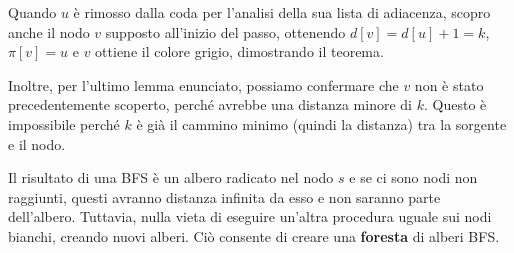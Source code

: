 \noindent Quando $u$ è rimosso dalla coda per l'analisi della sua lista di adiacenza, scopro anche il nodo $v$ supposto all'inizio del passo, ottenendo $d[v] = d[u]+1 = k$, $\pi[v] = u$ e $v$ ottiene il colore grigio, dimostrando il teorema.\par
Inoltre, per l'ultimo lemma enunciato, possiamo confermare che $v$ non è stato precedentemente scoperto, perché avrebbe una distanza minore di $k$. Questo è impossibile perché $k$ è già il cammino minimo (quindi la distanza) tra la sorgente e il nodo.\newline

\noindent Il risultato di una BFS è un albero radicato nel nodo $s$ e se ci sono nodi non raggiunti, questi avranno distanza infinita da esso e non saranno parte dell'albero. Tuttavia, nulla vieta di eseguire un'altra procedura uguale sui nodi bianchi, creando nuovi alberi. Ciò consente di creare una \textbf{foresta} di alberi BFS.

%

